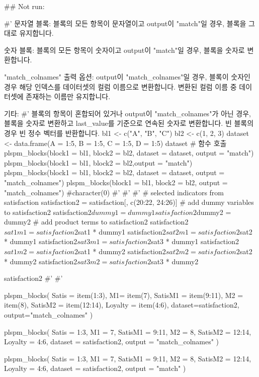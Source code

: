 \documentclass[a4paper]{book}
\begin{document}
\begin{Examples}
\begin{ExampleCode}

\#\# Not run: 

#'
문자열 블록:
  블록의 모든 항목이 문자열이고 output이 "match"일 경우,
   블록을 그대로 유지합니다.

숫자 블록:
  블록의 모든 항목이 숫자이고 output이 "match"일 경우,
  블록을 숫자로 변환합니다.

"match_colnames" 출력 옵션:
  output이 "match_colnames"일 경우, 블록이 숫자인
  경우 해당 인덱스를 데이터셋의 컬럼 이름으로
  변환합니다. 변환된 컬럼 이름 중 데이터셋에
  존재하는 이름만 유지합니다.

기타:
#'   블록의 항목이 혼합되어 있거나 output이
"match_colnames"가 아닌 경우, 블록을 숫자로
변환하고 last_value를 기준으로 연속된 숫자로
변환합니다. 빈 블록의 경우 빈 정수 벡터를
반환합니다.
bl1 <- c("A", "B", "C")
bl2 <- c(1, 2, 3)
dataset <- data.frame(A = 1:5, B = 1:5, C = 1:5, D = 1:5)
dataset
# 함수 호출
plspm_blocks(block1 = bl1, block2 = bl2,
dataset = dataset, output = "match")
plspm_blocks(block1 = bl1, block2 = bl2,output = "match")
plspm_blocks(block1 = bl1, block2 = bl2,
dataset = dataset, output = "match_colnames")
plspm_blocks(block1 = bl1, block2 = bl2,
output = "match_colnames") #character(0)
#'
#'
#'
# selected indicators from satisfaction
satisfaction2 = satisfaction[, c(20:22, 24:26)]
# add dummy variables to satisfaction2
satisfaction2$dummy1 = dummy1
satisfaction2$dummy2 = dummy2
# add product terms to satisfaction2
satisfaction2$sat1m1 = satisfaction2$sat1 * dummy1
satisfaction2$sat2m1 = satisfaction2$sat2 * dummy1
satisfaction2$sat3m1 = satisfaction2$sat3 * dummy1
satisfaction2$sat1m2 = satisfaction2$sat1 * dummy2
satisfaction2$sat2m2 = satisfaction2$sat2 * dummy2
satisfaction2$sat3m2 = satisfaction2$sat3 * dummy2

satisfaction2 %
#'
#'

plspm_blocks(
  Satis = item(1:3),
  M1= item(7),
  SatisM1 = item(9:11),
  M2 = item(8),
  SatisM2 = item(12:14),
  Loyalty = item(4:6),
  dataset=satisfaction2,
  output="match_colnames"
)


plspm_blocks(
  Satis = 1:3,
  M1 = 7,
  SatisM1 = 9:11,
  M2 = 8,
  SatisM2 = 12:14,
  Loyalty = 4:6,
  dataset = satisfaction2,
  output = "match_colnames"
)

plspm_blocks(
  Satis = 1:3,
  M1 = 7,
  SatisM1 = 9:11,
  M2 = 8,
  SatisM2 = 12:14,
  Loyalty = 4:6,
  dataset = satisfaction2,
  output = "match"
)




\end{ExampleCode}
\end{Examples}
\end{document}
